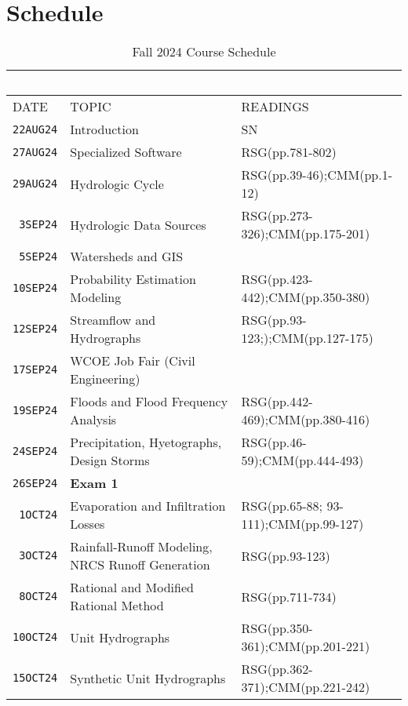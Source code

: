 \documentclass[12pt]{article}
\begin{document}
\section*{Schedule}
\begin{table}[ht!]
   \centering
   \caption{Fall 2024 Course Schedule}
   \begin{tabular}{p{0.5in}p{3.0in}p{3.0in}} 
   ~ & ~ & ~  \\
\hline
DATE & TOPIC & READINGS  \\
\hline
\texttt{22AUG24} & Introduction & SN  \\ %
\texttt{27AUG24} & Specialized Software & RSG(pp.781-802) \\ %
\texttt{29AUG24} & Hydrologic Cycle  & RSG(pp.39-46);CMM(pp.1-12)\\ %
\texttt{~3SEP24} & Hydrologic Data Sources & RSG(pp.273-326);CMM(pp.175-201)\\ %
\texttt{~5SEP24} & Watersheds and GIS &  \\ %
\texttt{10SEP24} & Probability Estimation Modeling &  RSG(pp.423-442);CMM(pp.350-380)\\ %
\texttt{12SEP24} & Streamflow and Hydrographs & RSG(pp.93-123;);CMM(pp.127-175)\\ %
\texttt{17SEP24} & WCOE Job Fair (Civil Engineering)   &   \\ %
\texttt{19SEP24} & Floods and Flood Frequency Analysis & RSG(pp.442-469);CMM(pp.380-416) \\ %
\texttt{24SEP24} & Precipitation, Hyetographs, Design Storms &  RSG(pp.46-59);CMM(pp.444-493) \\  %
\texttt{26SEP24} & \textbf{Exam 1} &  \\ %
\texttt{~1OCT24} & Evaporation and Infiltration Losses & RSG(pp.65-88; 93-111);CMM(pp.99-127) \\ %
\texttt{~3OCT24} & Rainfall-Runoff Modeling, NRCS Runoff Generation & RSG(pp.93-123) \\ %
\texttt{~8OCT24} & Rational and Modified Rational Method & RSG(pp.711-734) \\  %
\texttt{10OCT24} & Unit Hydrographs & RSG(pp.350-361);CMM(pp.201-221)\\ %
\texttt{15OCT24} & Synthetic Unit Hydrographs & RSG(pp.362-371);CMM(pp.221-242) \\ %

\end{tabular}
\end{table}
\end{document}
